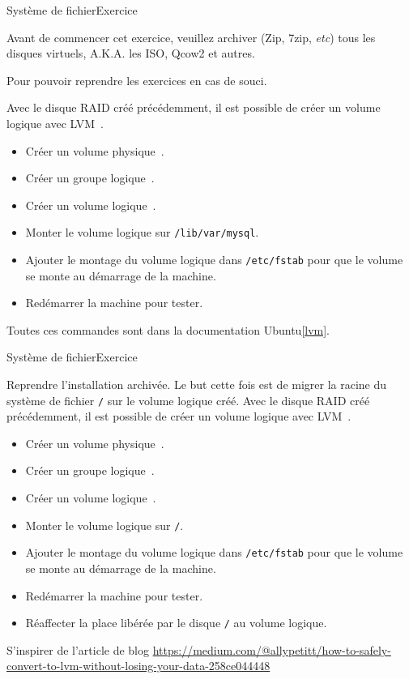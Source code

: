 \documentclass{beamer}
\begin{document}
    \begin{frame}{Système de fichier}{Exercice \execcounterdispinc}
        \begin{dangercolorbox}
            Avant de commencer cet exercice, veuillez archiver (Zip, 7zip, \textit{etc}) tous les disques virtuels, A.K.A. les ISO, Qcow2 et autres.

            Pour pouvoir reprendre les exercices en cas de souci.
        \end{dangercolorbox}
        Avec le disque RAID créé précédemment, il est possible de créer un volume logique avec LVM~.
        \begin{itemize}
            \item Créer un volume physique~.
            \item Créer un groupe logique~.
            \item Créer un volume logique~.
            \item Monter le volume logique sur \lstinline{/lib/var/mysql}.
            \item Ajouter le montage du volume logique dans \lstinline{/etc/fstab} pour que le volume se monte au démarrage de la machine.
            \item Redémarrer la machine pour tester.
        \end{itemize}
        Toutes ces commandes sont dans la documentation Ubuntu\cref{lvm}.
    \end{frame}

    \begin{frame}{Système de fichier}{Exercice \execcounterdispinc}
        \begin{small}
            Reprendre l'installation archivée.
            Le but cette fois est de migrer la racine du système de fichier \lstinline{/} sur le volume logique créé.
            \bigbreak
            Avec le disque RAID créé précédemment, il est possible de créer un volume logique avec LVM~.
            \begin{itemize}
                \item Créer un volume physique~.
                \item Créer un groupe logique~.
                \item Créer un volume logique~.
                \item Monter le volume logique sur \lstinline{/}.
                \item Ajouter le montage du volume logique dans \lstinline{/etc/fstab} pour que le volume se monte au démarrage de la machine.
                \item Redémarrer la machine pour tester.
                \item Réaffecter la place libérée par le disque \lstinline{/} au volume logique.
            \end{itemize}
            S'inspirer de l'article de blog \url{https://medium.com/@allypetitt/how-to-safely-convert-to-lvm-without-losing-your-data-258ce044448}
        \end{small}
    \end{frame}
\end{document}

